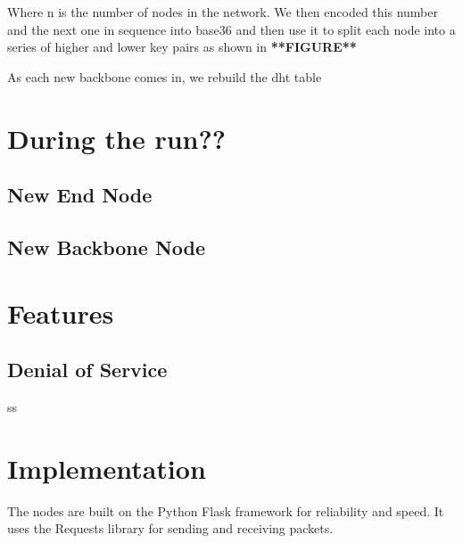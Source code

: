 Where n is the number of nodes in the network. We then encoded this number and the next one in sequence into base36 and then use it to split each node into a series of higher and lower key pairs as shown in \textbf{**FIGURE**}


As each new backbone comes in, we rebuild the dht table


\section{During the run??}

\subsection{New End Node}

\subsection{New Backbone Node}

\section{Features}

\subsection{Denial of Service}ss

\section{Implementation}

The nodes are built on the Python Flask framework for reliability and speed. It uses the Requests library for sending and receiving packets.


